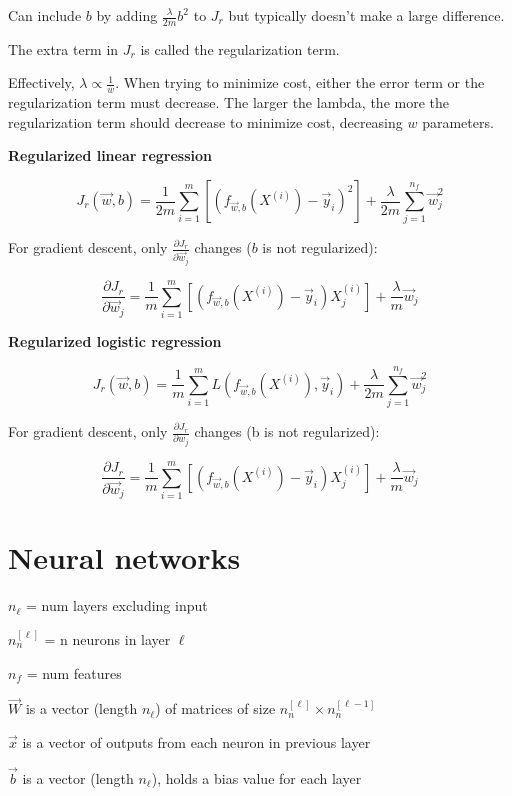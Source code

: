 \documentclass[12pt]{article}
\begin{document}
Can include $b$ by adding $\frac{\lambda}{2m} b^2$ to $J_r$ but typically doesn't make a large difference.

The extra term in $J_r$ is called the regularization term.

Effectively, $\lambda \propto \frac{1}{w}$. When trying to minimize cost, either the error term or the regularization term must decrease. The larger the lambda, the more the regularization term should decrease to minimize cost, decreasing $w$ parameters.

\noindent \textbf{Regularized linear regression}

\[ J_r(\vec{w},b) = \frac{1}{2m} \sum_{i=1}^m \left[(f_{\vec{w},b}(X^{(i)}) - \vec{y}_i)^2\right] + \frac{\lambda}{2m} \sum_{j=1}^{n_f} \vec{w}_j^2 \]

For gradient descent, only $\frac{\partial J_r}{\partial \vec{w}_j}$ changes ($b$ is not regularized):

\[ \frac{\partial J_r}{\partial \vec{w}_j} = \frac{1}{m} \sum_{i=1}^m \left[(f_{\vec{w},b}(X^{(i)}) - \vec{y}_i)X_j^{(i)}\right] + \frac{\lambda}{m} \vec{w}_j \]

\noindent \textbf{Regularized logistic regression}

\[ J_r(\vec{w},b) = \frac{1}{m} \sum_{i=1}^m L(f_{\vec{w},b}(X^{(i)}), \vec{y}_i) + \frac{\lambda}{2m} \sum_{j=1}^{n_f} \vec{w}_j^2 \]

For gradient descent, only $\frac{\partial J_r}{\partial w_j}$ changes (b is not regularized):

\[ \frac{\partial J_r}{\partial \vec{w}_j} = \frac{1}{m} \sum_{i=1}^m \left[(f_{\vec{w},b}(X^{(i)}) - \vec{y}_i)X_j^{(i)}\right] + \frac{\lambda}{m} \vec{w}_j \]

\pagebreak

\section{Neural networks}

$n_{\ell}$ = num layers excluding input

$n^{[\ell]}_n$ = n neurons in layer $\ell$

$n_f$ = num features

$\vec{W}$ is a vector (length $n_{\ell}$) of matrices of size $n^{[\ell]}_n \times n^{[\ell-1]}_n$

$\vec{x}$ is a vector of outputs from each neuron in previous layer

$\vec{b}$ is a vector (length $n_{\ell}$), holds a bias value for each layer
\end{document}
